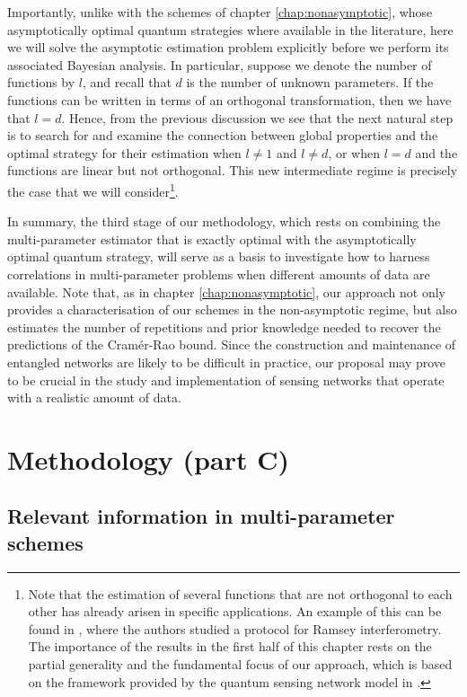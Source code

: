 Importantly, unlike with the schemes of chapter \ref{chap:nonasymptotic}, whose asymptotically optimal quantum strategies where available in the literature, here we will solve the asymptotic estimation problem explicitly before we perform its associated Bayesian analysis. In particular, suppose we denote the number of functions by $l$, and recall that $d$ is the number of unknown parameters. If the functions can be written in terms of an orthogonal transformation, then we have that $l = d$. Hence, from the previous discussion we see that the next natural step is to search for and examine the connection between global properties and the optimal strategy for their estimation when $l\neq 1$ and $l\neq d$, or when $l = d$ and the functions are linear but not orthogonal. This new intermediate regime is precisely the case that we will consider\footnote{Note that the estimation of several functions that are not orthogonal to each other has already arisen in specific applications. An example of this can be found in \cite{li2019}, where the authors studied a protocol for Ramsey interferometry. The importance of the results in the first half of this chapter rests on the partial generality and the fundamental focus of our approach, which is based on the framework provided by the quantum sensing network model in \cite{proctor2017networked}.}.  

In summary, the third stage of our methodology, which rests on combining the multi-parameter estimator that is exactly optimal with the asymptotically optimal quantum strategy, will serve as a basis to investigate how to harness correlations in multi-parameter problems when different amounts of data are available. Note that, as in chapter \ref{chap:nonasymptotic}, our approach not only provides a characterisation of our schemes in the non-asymptotic regime, but also estimates the number of repetitions and prior knowledge needed to recover the predictions of the Cram\'{e}r-Rao bound. Since the construction and maintenance of entangled networks are likely to be difficult in practice, our proposal may prove to be crucial in the study and implementation of sensing networks that operate with a realistic amount of data. 
 
\section{Methodology (part C)}

\subsection{Relevant information in multi-parameter schemes}
\label{subsec:relevantinfo}

